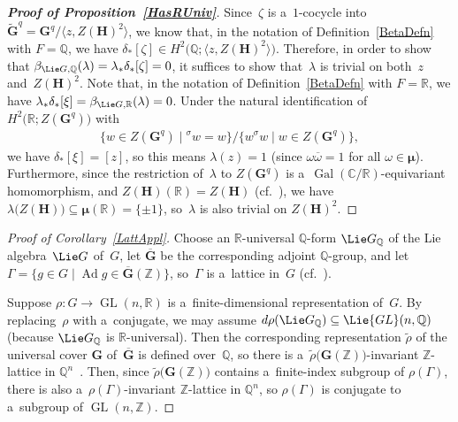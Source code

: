 \documentclass[pdftex]{sigma}
\DeclareMathOperator{\Gal}{Gal}
\DeclareMathOperator{\GL}{GL}
\numberwithin{equation}{section}
\begin{document}
\begin{proof}[\bf Proof of Proposition~\ref{HasRUniv}]
Since~$\zeta$ is a~$1$-cocycle into $\widetilde{\mathbf{G}}^q = \mathbf{G}^q/\langle z, Z(\mathbf{H})^2 \rangle$, we know
that, in the notation of Def\/inition~\ref{BetaDefn} with $F = \mathbb{Q}$, we have $\delta_*[\zeta] \in H^2\bigl(\mathbb{Q};
\langle z, Z(\mathbf{H})^2 \rangle\bigr)$.
Therefore, in order to show that $\beta_{\Lie G, \mathbb{Q}}(\lambda) = \lambda_* \delta_*[\zeta] = 0$, it suf\/f\/ices to
show that~$\lambda$ is trivial on both~$z$ and~$Z(\mathbf{H})^2$.
Note that, in the notation of Def\/inition~\ref{BetaDefn} with $F = \mathbb{R}$, we have $\lambda_* \delta_*[\xi] = \beta_{\Lie G,
\mathbb{R}}(\lambda) = 0$.
Under the natural identif\/ication of $H^2 \bigl(\mathbb{R}; Z(\mathbf{G}^q) \bigr)$ with
\begin{gather*}
\{ w \in Z(\mathbf{G}^q) \mid {}^\sigma w = w \} / \{ w {}^\sigma w \mid w \in Z(\mathbf{G}^q) \},
\end{gather*}
we have $\delta_* [\xi] = [z]$, so this means $\lambda(z) = 1$ (since $\omega \overline{\omega} = 1$ for all $\omega \in
\boldsymbol\mu$).
Furthermore, since the restriction of~$\lambda$ to $Z(\mathbf{G}^q)$ is a~$\Gal(\mathbb{C}/\mathbb{R})$-equivariant
homomorphism, and $Z(\mathbf{H})(\mathbb{R}) = Z(\mathbf{H})$ (cf.~\cite[p.~332]{PlatonovRapinchukBook}), we have
$\lambda \bigl(Z(\mathbf{H}) \bigr) \subseteq \boldsymbol\mu(\mathbb{R}) = \{\pm1\}$, so~$\lambda$ is also trivial on
$Z(\mathbf{H})^2$.
\end{proof}

\begin{proof}[Proof of Corollary~\ref{LattAppl}] Choose an $\mathbb{R}$-universal $\mathbb{Q}$-form $\Lie G_\mathbb{Q}$ of the Lie
algebra~$\Lie G$ of~$G$, let $\overline{\mathbf{G}}$ be the corresponding adjoint $\mathbb{Q}$-group, and let $\Gamma = \{
g \in G \mid \mathop{\mathrm{Ad}} g \in \overline{\mathbf{G}}(\mathbb{Z}) \}$, so~$\Gamma$ is a~lattice in~$G$
(cf.~\cite[Theorem~4.14, p.~220]{PlatonovRapinchukBook}).

Suppose $\rho \colon G \to \GL(n,\mathbb{R})$ is a~f\/inite-dimensional representation of~$G$.
By replacing~$\rho$ with a~conjugate, we may assume $d\rho(\Lie G_\mathbb{Q}) \subseteq \Lie{GL}(n,\mathbb{Q})$ (because
$\Lie G_\mathbb{Q}$ is $\mathbb{R}$-universal).
Then the corresponding representation $\widetilde\rho$ of the universal cover $\mathbf{G}$ of~$\overline{\mathbf{G}}$ is
def\/ined over~$\mathbb{Q}$, so there is a~$\widetilde\rho \bigl(\mathbf{G}(\mathbb{Z}) \bigr)$-invariant
$\mathbb{Z}$-lattice in $\mathbb{Q}^n$~\cite[Remark on p.~173]{PlatonovRapinchukBook}.
Then, since $\widetilde\rho \bigl(\mathbf{G}(\mathbb{Z}) \bigr)$ contains a~f\/inite-index subgroup of $\rho(\Gamma)$,
there is also a~$\rho(\Gamma)$-invariant $\mathbb{Z}$-lattice in $\mathbb{Q}^n$, so $\rho(\Gamma)$ is conjugate to
a~subgroup of $\GL(n,\mathbb{Z})$.
\end{proof}
\end{document}
